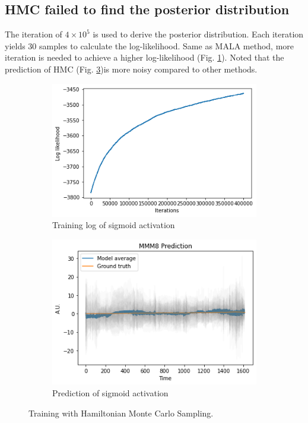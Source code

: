 \documentclass{article}
\begin{document}
\subsection{HMC failed to find the posterior distribution}

The iteration of $4\times 10^5$ is used to derive the posterior distribution. Each iteration yields $30$ samples to calculate the log-likelihood. Same as MALA method, more iteration is needed to achieve a higher log-likelihood (Fig. \ref{training-log-HMC}). Noted that the prediction of HMC (Fig. \ref{prediction-HMC})is more noisy compared to other methods.

\begin{figure}[h]
    \centering
    \begin{subfigure}[b]{0.5\textwidth}
        \centering
        \includegraphics[width=\textwidth]{../img/training_HMC_400000_iter.png}
        \caption{Training log of sigmoid activation}
        \label{training-log-HMC}
    \end{subfigure}\hfill
    \begin{subfigure}[b]{0.5\textwidth}
        \centering
        \includegraphics[trim={0 0 0 0.7cm}, clip, width=\textwidth]{../img/prediction_HMC_400000_iter.png}
        \caption{Prediction of sigmoid activation}
        \label{prediction-HMC}
    \end{subfigure}
    \caption{Training with Hamiltonian Monte Carlo Sampling\citep{neal1996}.}
\end{figure}
\end{document}
